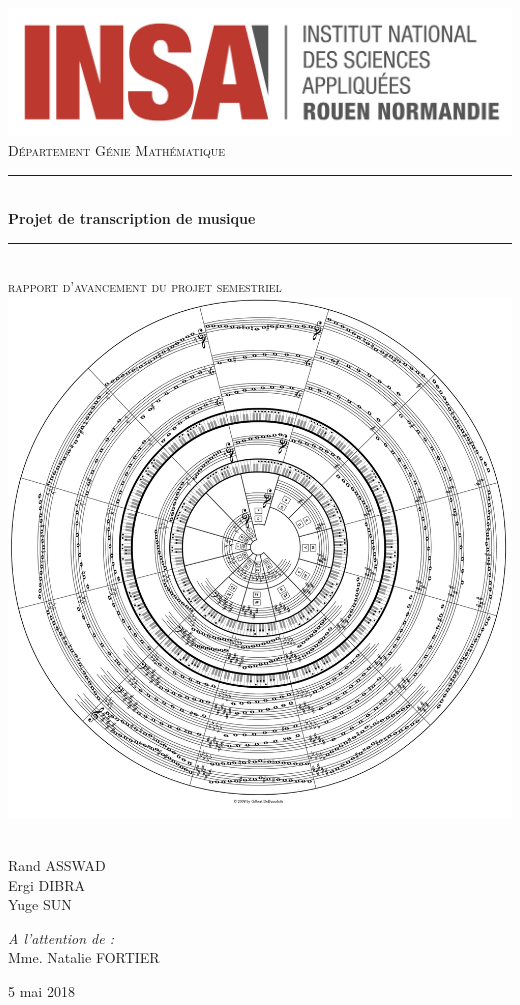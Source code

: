 \documentclass[a4paper]{article}
\newcommand{\HRule}{\rule{\linewidth}{0.5mm}}
\begin{document}
\begin{titlepage}
  \begin{sffamily}
  \begin{center}

    \includegraphics[scale=0.15]{INSA_logo}\\[2cm]

    \textsc{\huge Département Génie Mathématique}\\[0.7cm]

    \HRule \\[0.4cm]
    {\huge \bfseries Projet de transcription de musique \\[0.4cm]}
    \HRule \\[1cm]
	\textsc{\huge rapport d'avancement du projet semestriel}\\[0.7cm]

    \includegraphics[width=.6\textwidth]{fifths_circle.png}~\\[1cm]

    \begin{minipage}{0.4\textwidth}
		\Large\raggedright
        Rand ASSWAD\\
		Ergi DIBRA\\
		Yuge SUN
    \end{minipage}
    \begin{minipage}{0.4\textwidth}
		\Large\raggedleft
		\emph{A l'attention de :}\\
		Mme. Natalie FORTIER
    \end{minipage}

	\vfill
    {\large 5 mai 2018}
  \end{center}
  \end{sffamily}
\end{titlepage}
\end{document}
